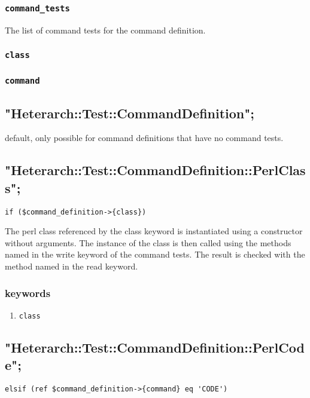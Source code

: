 \documentclass[11pt]{article}
\begin{document}
\subsubsection{\texttt{command\_tests}}
\label{sec-3-1-2}
The list of command tests for the command definition.
\subsubsection{\texttt{class}}
\label{sec-3-1-3}
\subsubsection{\texttt{command}}
\label{sec-3-1-4}

\subsection{"Heterarch::Test::CommandDefinition";}
\label{sec-3-2}
default, only possible for command definitions that have no command
tests.

\subsection{"Heterarch::Test::CommandDefinition::PerlClass";}
\label{sec-3-3}
\begin{verbatim}
if ($command_definition->{class})
\end{verbatim}

The perl class referenced by the class keyword is instantiated using a
constructor without arguments.  The instance of the class is then
called using the methods named in the write keyword of the command
tests.  The result is checked with the method named in the read
keyword.

\subsubsection{keywords}
\label{sec-3-3-1}
\begin{enumerate}
\item \texttt{class}
\label{sec-3-3-1-1}
\end{enumerate}


\subsection{"Heterarch::Test::CommandDefinition::PerlCode";}
\label{sec-3-4}
\begin{verbatim}
elsif (ref $command_definition->{command} eq 'CODE')
\end{verbatim}
\end{document}
